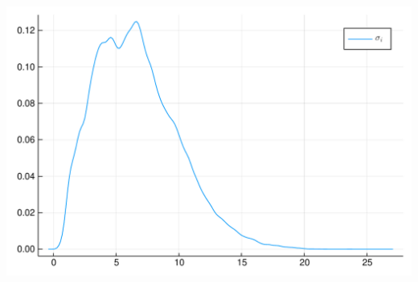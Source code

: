 \documentclass[12pt,a4paper]{article}
\begin{document}
\includegraphics[width=\linewidth]{figures/carlos_mcmc_23_1.pdf}
\end{document}
